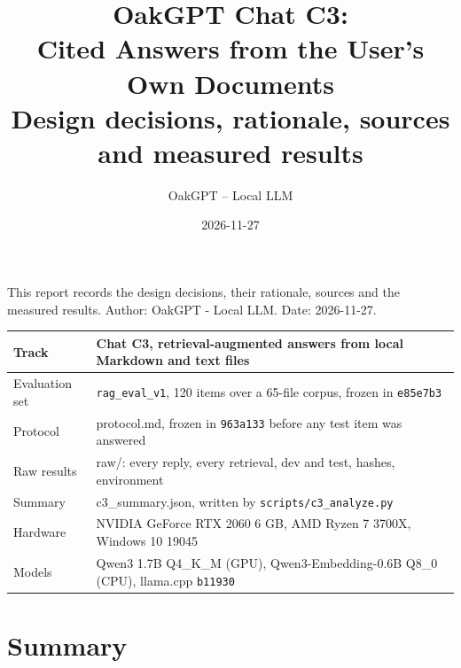 \documentclass[11pt,a4paper]{article}
\title{\textbf{OakGPT Chat C3:\\Cited Answers from the User's Own Documents}\\[4pt]
  \large Design decisions, rationale, sources and measured results}
\author{OakGPT -- Local LLM}
\date{2026-11-27}
\newcommand{\code}[1]{\texttt{#1}}
\begin{document}
\maketitle


This report records the design decisions, their rationale, sources and the measured results. Author: OakGPT - Local LLM. Date: 2026-11-27.

\begin{table}[H]\centering\small
\begin{tabularx}{\textwidth}{@{}lY@{}}
\toprule
Track & Chat C3, retrieval-augmented answers from local Markdown and text files \\
\midrule
Evaluation set & \code{rag\_eval\_v1}, 120 items over a 65-file corpus, frozen in \code{e85e7b3} \\
Protocol & protocol.md, frozen in \code{963a133} before any test item was answered \\
Raw results & raw/: every reply, every retrieval, dev and test, hashes, environment \\
Summary & c3\_summary.json, written by \code{scripts/c3\_analyze.py} \\
Hardware & NVIDIA GeForce RTX 2060 6 GB, AMD Ryzen 7 3700X, Windows 10 19045 \\
Models & Qwen3 1.7B Q4\_K\_M (GPU), Qwen3-Embedding-0.6B Q8\_0 (CPU), llama.cpp \code{b11930} \\
\bottomrule\end{tabularx}\end{table}

\section{Summary}
\end{document}
